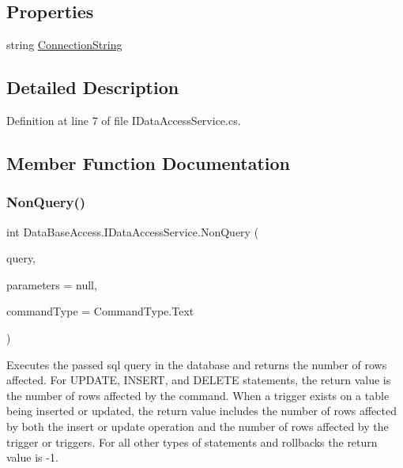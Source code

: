 \subsection*{Properties}
\begin{DoxyCompactItemize}
\item 
string \mbox{\hyperlink{interfaceDataBaseAccess_1_1IDataAccessService_aced282143a1c60f5cc534af50cf10b32}{Connection\+String}}
\end{DoxyCompactItemize}


\subsection{Detailed Description}


Definition at line 7 of file I\+Data\+Access\+Service.\+cs.



\subsection{Member Function Documentation}
\mbox{\label{interfaceDataBaseAccess_1_1IDataAccessService_a2fb8cf4238c955d7884bdb405bef50e1}} 
\subsubsection{\texorpdfstring{NonQuery()}{NonQuery()}}
{\footnotesize\ttfamily int Data\+Base\+Access.\+I\+Data\+Access\+Service.\+Non\+Query (\begin{DoxyParamCaption}\item[{string}]{query,  }\item[{Dictionary$<$ string, object $>$}]{parameters = {\ttfamily null},  }\item[{Command\+Type}]{command\+Type = {\ttfamily CommandType.Text} }\end{DoxyParamCaption})}



Executes the passed sql query in the database and returns the number of rows affected. For U\+P\+D\+A\+TE, I\+N\+S\+E\+RT, and D\+E\+L\+E\+TE statements, the return value is the number of rows affected by the command. When a trigger exists on a table being inserted or updated, the return value includes the number of rows affected by both the insert or update operation and the number of rows affected by the trigger or triggers. For all other types of statements and rollbacks the return value is -\/1. 



